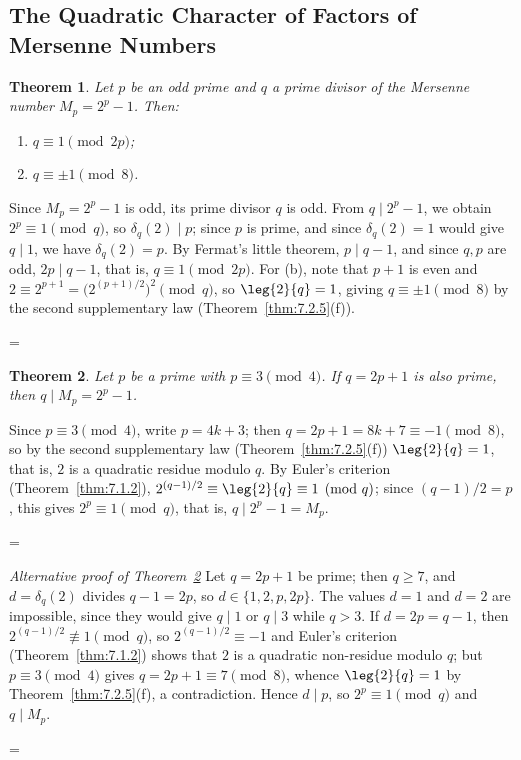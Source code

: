\documentclass[11pt]{article}
\makeatletter
\theoremstyle{ntstyle}
\newtheorem{theorem}{Theorem}[subsection]
\let\nt@closedisplay\]
\def\nt@guardedclose{\@ifnextchar\par{\nt@closeafterpar}{\@ifnextchar\end{\postdisplaypenalty\@M\nt@closedisplay}{\nt@closedisplay}}}
\def\nt@closeafterpar\par{\@ifnextchar\par{\nt@closeafterpar}{\@ifnextchar\end{\postdisplaypenalty\@M\nt@closedisplay\par}{\nt@closedisplay\par}}}
\renewenvironment{proof}[1][\proofname]{\par
  \pushQED{\qed}\normalfont\topsep\medskipamount\edef\nt@afterproof{\@endparpenalty=\the\@endparpenalty\relax}\@beginparpenalty\@M\@endparpenalty\@M\let\]\nt@guardedclose\trivlist\item[]\textit{#1\@addpunct{.}} \ignorespaces}{\ifvmode\addpenalty\@M\fi\popQED\nt@afterproof\endtrivlist\@endpefalse}
\newenvironment{altproof}[1][\proofname]{\begin{proof}[#1]\renewcommand{\qedsymbol}{}}{\end{proof}}
\makeatother
\begin{document}
\subsection{The Quadratic Character of Factors of Mersenne Numbers}

\begin{theorem}\label{thm:9.2.1} Let $p$ be an odd prime and $q$ a
	prime divisor of the Mersenne number $M_p = 2^p - 1$. Then:
	\begin{enumerate}[label={\alph*)}]
		\item $q\equiv 1 \pmod{2p}$;
		\item $q \equiv \pm 1 \pmod{8}$.
	\end{enumerate}

\end{theorem}

\begin{proof} Since $M_p = 2^{p} - 1$ is odd, its prime
	divisor $q$ is odd. From $q \mid 2^p - 1$, we obtain $2^p \equiv 1 \pmod{q}$, so $\delta_q(2) \mid p$; since $p$ is prime, and since
	$\delta_q(2) = 1$ would give $q \mid 1$, we have
	$\delta_q(2) = p$. By Fermat's little theorem, $p \mid q - 1$, and since
	$q, p$ are odd, $2p \mid q - 1$, that is, $q \equiv 1 \pmod{2p}$. For
	(b), note that $p+1$ is even and $2 \equiv 2^{p+1} = \big(2^{(p+1)/2}\big)^2
		\pmod{q}$, so $\leg{2}{q} = 1$, giving $q \equiv \pm 1
		\pmod{8}$ by the second supplementary law (Theorem~\ref{thm:7.2.5}(f)).

\end{proof}
\begin{theorem}\label{thm:9.2.2} Let $p$ be a prime with $p \equiv 3 \pmod{4}$. If $q = 2p
		+ 1$ is also prime, then $q \mid M_p = 2^{p} - 1$.

\end{theorem}

\begin{proof} Since $p \equiv 3 \pmod{4}$, write $p = 4k +
		3$; then $q = 2p + 1 = 8k + 7 \equiv -1 \pmod{8}$, so by the second
	supplementary law (Theorem~\ref{thm:7.2.5}(f)) $\leg{2}{q} = 1$, that is, $2$ is a
	quadratic residue modulo $q$. By Euler's criterion (Theorem~\ref{thm:7.1.2}),
	$2^{(q-1)/2} \equiv \leg{2}{q} \equiv 1 \pmod{q}$; since
	$(q-1)/2 = p$, this gives $2^{p} \equiv 1 \pmod{q}$, that is, $q \mid
		2^{p} - 1 = M_p$.

\end{proof}
\begin{altproof}[Alternative proof of Theorem~\ref{thm:9.2.2}]
	Let $q=2p+1$ be prime; then $q\ge7$, and $d=\delta_q(2)$ divides
	$q-1=2p$, so $d\in\{1,2,p,2p\}$. The values $d=1$ and $d=2$ are
	impossible, since they would give $q\mid1$ or $q\mid3$ while $q>3$. If
	$d=2p=q-1$, then $2^{(q-1)/2}\not\equiv1\pmod{q}$, so
	$2^{(q-1)/2}\equiv-1$ and Euler's criterion (Theorem~\ref{thm:7.1.2}) shows that $2$ is
	a quadratic non-residue modulo $q$; but $p\equiv3\pmod{4}$ gives
	$q=2p+1\equiv7\pmod{8}$, whence $\leg{2}{q}=1$ by Theorem~\ref{thm:7.2.5}(f),
	a contradiction. Hence $d\mid p$, so $2^{p}\equiv1\pmod{q}$
	and $q\mid M_p$.

\end{altproof}
\end{document}
